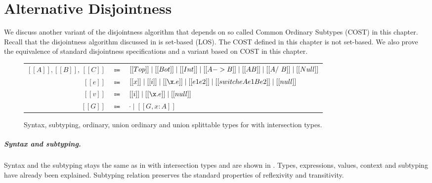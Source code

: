 \chapter{Alternative Disjointness}
\label{appendix1}


We discuss another variant of the disjointness algorithm
that depends on so called Common Ordinary Subtypes
(COST) in this chapter. Recall that the disjointness
algorithm discussed in  is set-based (LOS).
The COST defined in this chapter is not set-based.
We also prove the equivalence of standard disjointness specifications
and a variant based on COST in this chapter.



\begin{figure}[!h]
      \begin{small}
      \begin{center}
        \begin{tabular}{rcl}
          \toprule
          $[[A]], [[B]]$, $[[C]]$ & $\Coloneqq$ & $ [[Top]] \mid [[Bot]] \mid [[Int]] \mid [[A -> B]] \mid [[A \/ B]] \mid [[A /\ B]] \mid [[Null]] $ \\
          $[[e]]$ & $\Coloneqq$ & $ [[x]] \mid [[i]] \mid [[\x.e]] \mid [[e1 e2]] \mid [[switch e A e1 B e2]] \mid [[null]]$\\
          $[[v]]$ & $\Coloneqq$ & $ [[i]] \mid [[\x.e]] \mid [[null]] $ \\
          $[[G]]$ & $\Coloneqq$ & $ \cdot \mid [[G , x : A]] $ \\
          \bottomrule
        \end{tabular}

      \end{center}
      \end{small}
  \caption{Syntax, subtyping, ordinary, union ordinary and union splittable types for \name with intersection types.}
  \label{fig:cost:syntax:sub}
\end{figure}


\paragraph{Syntax and subtyping.}
Syntax and the subtyping stays the same as in
\name with intersection types and are shown in
. Types, expressions,
values, context and subtyping have already
been explained. Subtyping relation preserves
the standard properties of reflexivity and
transitivity.

